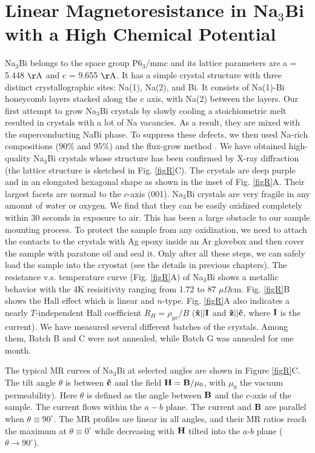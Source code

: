 \section{Linear Magnetoresistance in Na$_3$Bi with a High Chemical Potential}
\label{sec:na3bi:lmr}


Na$_3$Bi belongs to the space group P6$_3$/mmc and its lattice parameters are a = 5.448 $\rm{\AA}$ and c = 9.655 $\rm{\AA}$. It has a simple crystal structure with three distinct crystallographic sites: Na(1), Na(2), and Bi. It consists of Na(1)-Bi honeycomb layers stacked along the c axis, with Na(2) between the layers. Our first attempt to grow Na$_3$Bi crystals by slowly cooling a stoichiometric melt resulted in crystals with a lot of Na vacancies. As a result, they are mixed with the superconducting NaBi phase. To suppress these defects, we then used Na-rich compositions (90$\%$ and 95$\%$) and the flux-grow method \cite{Kushwaha}. We have obtained high-quality Na$_3$Bi crystals whose structure has been confirmed by X-ray diffraction (the lattice structure is sketched in Fig. \ref{figR}C). The crystals are deep purple and in an elongated hexagonal shape as shown in the inset of Fig. \ref{figR}A. Their largest facets are normal to the $c$-axis (001). Na$_3$Bi crystals are very fragile in any amount of water or oxygen. We find that they can be easily oxidized completely within 30 seconds in exposure to air. This has been a large obstacle to our sample mounting process. To protect the sample from any oxidization, we need to attach the contacts to the crystals with Ag epoxy inside an Ar glovebox and then cover the sample with paratone oil and seal it. Only after all these steps, we can safely load the sample into the cryostat (see the details in previous chapters). The resistance v.s. temperature curve (Fig. \ref{figR}A) of Na$_3$Bi shows a metallic behavior with the 4K resisitivity ranging from 1.72 to 87 $\mu\Omega$cm. Fig. \ref{figR}B shows the Hall effect which is linear and $n$-type. Fig. \ref{figR}A also indicates a nearly $T$-independent Hall coefficient $R_H = \rho_{yx}/B$ ($\bf\hat{x}||I$ and $\bf\hat{z}||\hat{c}$, where $\bf I$ is the current). We have measured several different batches of the crystals. Among them, Batch B and C were not annealed, while Batch G was annealed for one month. 

The typical MR curves of Na$_3$Bi at selected angles are shown in Figure \ref{figR}C. The tilt angle $\theta$ is between $\bf\hat{c}$ and the field ${\bf H}={\bf B}/\mu_0$, with $\mu_0$ the vacuum permeability). Here $\theta$ is defined as the angle between $\bf B$ and the $c$-axis of the sample. The current flows within the $a-b$ plane. The current and $\bf B$ are parallel when $\theta \equiv 90^\circ$. The MR profiles are linear in all angles, and their MR ratios reach the maximum at $\theta \equiv 0^\circ$ while decreasing with $\bf H$ tilted into the $a$-$b$ plane ($\theta\to 90^\circ$). 


